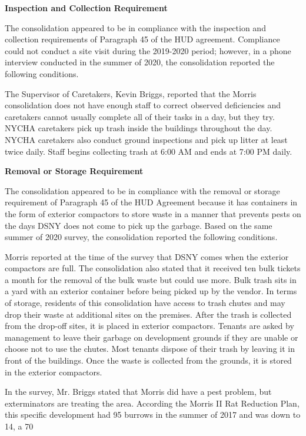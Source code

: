 
\textbf{Inspection and Collection Requirement}

The consolidation appeared to be in compliance with the inspection and collection requirements of Paragraph 45 of the HUD agreement. Compliance could not conduct a site visit during the 2019-2020 period; however, in a phone interview conducted in the summer of 2020, the consolidation reported the following conditions.

The Supervisor of Caretakers, Kevin Briggs, reported that the Morris consolidation does not have enough staff to correct observed deficiencies and caretakers cannot usually complete all of their tasks in a day, but they try. NYCHA caretakers pick up trash inside the buildings throughout the day. NYCHA caretakers also conduct ground inspections and pick up litter at least twice daily. Staff begins collecting trash at 6:00 AM and ends at 7:00 PM daily. 

\textbf{Removal or Storage Requirement}

The consolidation appeared to be in compliance with the removal or storage requirement of Paragraph  45 of the HUD Agreement because it has containers in the form of exterior compactors to store waste in a manner that prevents pests on the days DSNY does not come to pick up the garbage. Based on the same summer of  2020 survey, the consolidation reported the following conditions.

Morris reported at the time of the survey that DSNY comes when the exterior compactors are full. The consolidation also stated that it received ten bulk tickets a month for the removal of the bulk waste but could use more. Bulk trash sits in a yard with an exterior container before being picked up by the vendor. In terms of storage, residents of this consolidation have access to trash chutes and may drop their waste at additional sites on the premises. After the trash is collected from the drop-off sites, it is placed in exterior compactors. Tenants are asked by management to leave their garbage on development grounds if they are unable or choose not to use the chutes. Most tenants dispose of their trash by leaving it in front of the buildings. Once the waste is collected from the grounds, it is stored in the exterior compactors.  

In the survey, Mr. Briggs stated that Morris did have a pest problem, but exterminators are treating the area. According the Morris II Rat Reduction Plan, this specific development had 95 burrows in the summer of 2017 and was down to 14, a 70%

